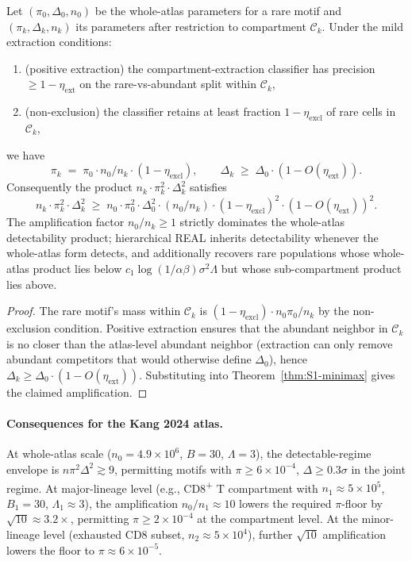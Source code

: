 \begin{theorem}
\label{thm:S1-hierarchical}
Let $(\pi_{0}, \Delta_{0}, n_{0})$ be the whole-atlas parameters for a rare motif and $(\pi_{k}, \Delta_{k}, n_{k})$ its parameters after restriction to compartment $\mathcal{C}_{k}$. Under the mild extraction conditions:
\begin{enumerate}[leftmargin=*,nosep]
  \item (positive extraction) the compartment-extraction classifier has precision $\geq 1 - \eta_{\text{ext}}$ on the rare-vs-abundant split within $\mathcal{C}_{k}$,
  \item (non-exclusion) the classifier retains at least fraction $1 - \eta_{\text{excl}}$ of rare cells in $\mathcal{C}_{k}$,
\end{enumerate}
we have
\[
  \pi_{k} \;=\; \pi_{0}\cdot n_{0}/n_{k}\cdot (1 - \eta_{\text{excl}}),
  \qquad
  \Delta_{k} \;\geq\; \Delta_{0}\cdot (1 - O(\eta_{\text{ext}})).
\]
Consequently the product $n_{k}\cdot \pi_{k}^{2}\cdot \Delta_{k}^{2}$ satisfies
\[
  n_{k}\cdot \pi_{k}^{2}\cdot \Delta_{k}^{2}
  \;\geq\;
  n_{0}\cdot \pi_{0}^{2}\cdot \Delta_{0}^{2} \cdot (n_{0}/n_{k}) \cdot (1 - \eta_{\text{excl}})^{2}\cdot (1 - O(\eta_{\text{ext}}))^{2}.
\]
The amplification factor $n_{0}/n_{k}\geq 1$ strictly dominates the whole-atlas detectability product; hierarchical REAL inherits detectability whenever the whole-atlas form detects, and additionally recovers rare populations whose whole-atlas product lies below $c_{1}\log(1/\alpha\beta)\sigma^{2}\Lambda$ but whose sub-compartment product lies above.
\end{theorem}

\begin{proof}
The rare motif's mass within $\mathcal{C}_{k}$ is $(1-\eta_{\text{excl}})\cdot n_{0}\pi_{0}/n_{k}$ by the non-exclusion condition. Positive extraction ensures that the abundant neighbor in $\mathcal{C}_{k}$ is no closer than the atlas-level abundant neighbor (extraction can only remove abundant competitors that would otherwise define $\Delta_{0}$), hence $\Delta_{k}\geq \Delta_{0}\cdot (1 - O(\eta_{\text{ext}}))$. Substituting into Theorem~\ref{thm:S1-minimax} gives the claimed amplification.
\end{proof}

\paragraph{Consequences for the Kang 2024 atlas.}
At whole-atlas scale ($n_{0} = 4.9\times 10^{6}$, $B=30$, $\Lambda=3$), the detectable-regime envelope is $n\pi^{2}\Delta^{2}\gtrsim 9$, permitting motifs with $\pi\geq 6\times 10^{-4}$, $\Delta\geq 0.3\sigma$ in the joint regime. At major-lineage level (e.g., CD8\textsuperscript{+} T compartment with $n_{1}\approx 5\times 10^{5}$, $B_{1}=30$, $\Lambda_{1}\approx 3$), the amplification $n_{0}/n_{1}\approx 10$ lowers the required $\pi$-floor by $\sqrt{10}\approx 3.2\times$, permitting $\pi\geq 2\times 10^{-4}$ at the compartment level. At the minor-lineage level (exhausted CD8 subset, $n_{2}\approx 5\times 10^{4}$), further $\sqrt{10}$ amplification lowers the floor to $\pi\approx 6\times 10^{-5}$.

